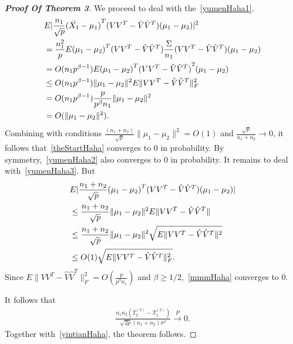 \begin{proof}[\textbf{Proof Of Theorem 3}]
    We proceed to deal with the~\eqref{yumenHaha1}.
\begin{align}
    &E|\frac{n_1}{\sqrt{p}}{(\bar{X_{1}}-\mu_1)}^T(VV^T-\hat{V}\hat{V}^T)(\mu_1-\mu_2)|^2
\label{theStartHaha}
\\
    &=\frac{n_1^2}{p}E{(\mu_1-\mu_2)}^T(VV^T-\hat{V}\hat{V}^T)\frac{\Sigma}{n_1}(VV^T-\hat{V}\hat{V}^T)(\mu_1-\mu_2)
    \notag\\
    &=O(n_1p^{\beta-1})E{(\mu_1-\mu_2)}^T{(VV^T-\hat{V}\hat{V}^T)}^2(\mu_1-\mu_2)
    \notag\\
&\leq
O(n_1p^{\beta-1})\|\mu_1-\mu_2\|^2E\|VV^T-\hat{V}\hat{V}^T\|^2_F
    \notag\\
    &=O(n_1p^{\beta-1})\frac{p}{p^{\beta}n_1}\|\mu_1-\mu_2\|^2
    \notag\\
    &=O(\|\mu_1-\mu_2\|^2).
    \notag
\end{align}
Combining with conditions $\frac{(n_1+n_2)}{\sqrt{p}}\|\mu_1-\mu_2\|^2=O(1)$ and $\frac{\sqrt{p}}{n_1+n_2}\to 0$, it follows that~\eqref{theStartHaha} converges to $0$ in probability.
    By symmetry,~\eqref{yumenHaha2} also converges to $0$ in probability. It remains to deal with~\eqref{yumenHaha3}. But
\begin{align}
    &E|\frac{n_1+n_2}{\sqrt{p}}{(\mu_1-\mu_2)}^T(VV^T-\hat{V}\hat{V}^T )(\mu_1-\mu_2)|
\label{mmmHaha}
\\
&\leq
\frac{n_1+n_2}{\sqrt{p}}\|\mu_1-\mu_2\|^2 E\|VV^T-\hat{V}\hat{V}^T\|
\notag
\\
    &\leq    \frac{n_1+n_2}{\sqrt{p}}\|\mu_1-\mu_2\|^2 \sqrt{E\|VV^T-\hat{V}\hat{V}^T\|^2}
\notag
\\
    &\leq O(1)\sqrt{E\|VV^T-\hat{V}\hat{V}^T\|^2_F}.
\notag
\end{align}
Since $E\|VV^T-\hat{V}\hat{V}^T\|^2_F=O(\frac{p}{p^{\beta}n_1})$ and $\beta\geq 1/2$,~\eqref{mmmHaha} converges to $0$.

It follows that
\begin{equation*}
\begin{aligned}
\frac{n_1n_2(T_2^{(2)}-T_1^{(2)})}{\sqrt{2p}(n_1+n_2)\sigma^2}\xrightarrow{P}0.
\end{aligned}
\end{equation*}
Together with~\eqref{yintianHaha}, the theorem follows.
\end{proof}
